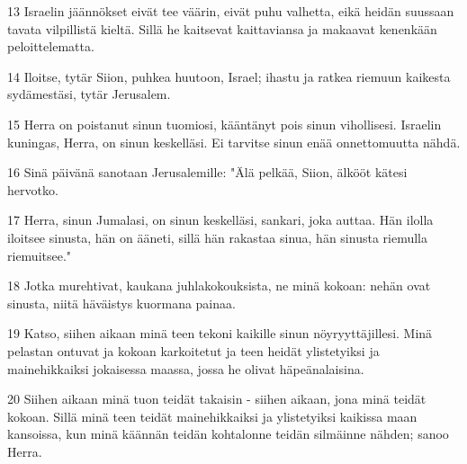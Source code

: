 \par 13 Israelin jäännökset eivät tee väärin, eivät puhu valhetta, eikä heidän suussaan tavata vilpillistä kieltä. Sillä he kaitsevat kaittaviansa ja makaavat kenenkään peloittelematta.
\par 14 Iloitse, tytär Siion, puhkea huutoon, Israel; ihastu ja ratkea riemuun kaikesta sydämestäsi, tytär Jerusalem.
\par 15 Herra on poistanut sinun tuomiosi, kääntänyt pois sinun vihollisesi. Israelin kuningas, Herra, on sinun keskelläsi. Ei tarvitse sinun enää onnettomuutta nähdä.
\par 16 Sinä päivänä sanotaan Jerusalemille: "Älä pelkää, Siion, älkööt kätesi hervotko.
\par 17 Herra, sinun Jumalasi, on sinun keskelläsi, sankari, joka auttaa. Hän ilolla iloitsee sinusta, hän on ääneti, sillä hän rakastaa sinua, hän sinusta riemulla riemuitsee."
\par 18 Jotka murehtivat, kaukana juhlakokouksista, ne minä kokoan: nehän ovat sinusta, niitä häväistys kuormana painaa.
\par 19 Katso, siihen aikaan minä teen tekoni kaikille sinun nöyryyttäjillesi. Minä pelastan ontuvat ja kokoan karkoitetut ja teen heidät ylistetyiksi ja mainehikkaiksi jokaisessa maassa, jossa he olivat häpeänalaisina.
\par 20 Siihen aikaan minä tuon teidät takaisin - siihen aikaan, jona minä teidät kokoan. Sillä minä teen teidät mainehikkaiksi ja ylistetyiksi kaikissa maan kansoissa, kun minä käännän teidän kohtalonne teidän silmäinne nähden; sanoo Herra.


